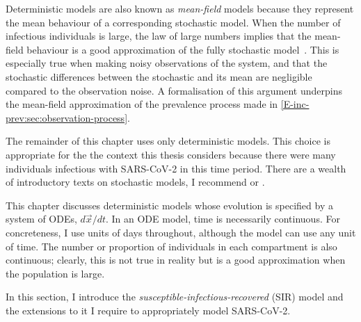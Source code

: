 \documentclass[thesis.tex]{subfiles}
\begin{document}
Deterministic models are also known as \emph{mean-field} models because they represent the mean behaviour of a corresponding stochastic model.
When the number of infectious individuals is large, the law of large numbers implies that the mean-field behaviour is a good approximation of the fully stochastic model~\autocite[20]{diekmannMathematical}.
This is especially true when making noisy observations of the system, and that the stochastic differences between the stochastic and its mean are negligible compared to the observation noise.
A formalisation of this argument underpins the mean-field approximation of the prevalence process made in \cref{E-inc-prev:sec:observation-process}.

The remainder of this chapter uses only deterministic models.
This choice is appropriate for the the context this thesis considers because there were many individuals infectious with SARS-CoV-2 in this time period.
There are a wealth of introductory texts on stochastic models, I recommend \textcite[chapter 6]{keelingModeling} or \textcite{birrellEvidence}.


This chapter discusses deterministic models whose evolution is specified by a system of ODEs, $d\vec{x}/dt$.
In an ODE model, time is necessarily continuous.%
For concreteness, I use units of days throughout, although the model can use any unit of time.
The number or proportion of individuals in each compartment is also continuous; clearly, this is not true in reality but is a good approximation when the population is large.

In this section, I introduce the \emph{susceptible-infectious-recovered} (SIR) model and the extensions to it I require to appropriately model SARS-CoV-2.


\end{document}
